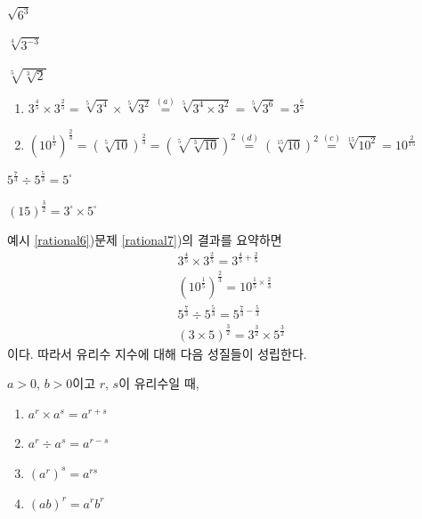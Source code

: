 \documentclass{oblivoir}
\begin{document}
%
\label{rational5}
\begin{enumerate*}[itemjoin=\hspace{.3\textwidth}]
\item
\(\sqrt{6^3}\)
\item
\(\sqrt[4]{3^{-3}}\)
\item
\(\sqrt[5]{\sqrt[3]{2}}\)
\end{enumerate*}

%
\begin{enumerate}\label{rational6}
\item
\(3^{\frac45}\times3^{\frac25}=\sqrt[5]{3^4}\times\sqrt[5]{3^2}\stackrel{(a)}=\sqrt[5]{3^4\times3^2}=\sqrt[5]{3^6}=3^{\frac 65}\)
\item
\((10^{\frac15})^{\frac23}=\left(\sqrt[5]{10}\right)^{\frac23}=\left(\sqrt[5]{\sqrt[3]{10}}\right)^2\stackrel{(d)}=\left(\sqrt[15]{10}\right)^2
\stackrel{(c)}=\sqrt[15]{10^2}=10^{\frac2{15}}\)
\end{enumerate}

%
\label{rational7}
\begin{enumerate*}[itemjoin=\hspace{.3\textwidth}]
\item
\(5^{\frac73}\div5^{\frac53}=5^\square\)
\item
\(\left(15\right)^{\frac32}=3^\square\times5^\square\)
\end{enumerate*}

\bigskip
예시 \ref{rational6})\과 문제 \ref{rational7})의 결과를 요약하면
\begin{gather*}
3^{\frac45}\times3^{\frac25}=3^{\frac45+\frac25}\\
\left(10^{\frac15}\right)^{\frac23}=10^{\frac15\times\frac23}\\
5^{\frac73}\div5^{\frac53}=5^{\frac73-\frac53}\\
\left(3\times5\right)^{\frac32}=3^{\frac32}\times5^{\frac32}
\end{gather*}
이다.
따라서 유리수 지수에 대해 다음 성질들이 성립한다.

%
\begin{mdframed}
\label{rational8}
\(a>0\), \(b>0\)이고 \(r\), \(s\)이 유리수일 때,
\begin{enumerate}
\item
\(a^r\times a^s=a^{r+s}\)
\item
\(a^r\div a^s=a^{r-s}\)
\item
\((a^r)^s=a^{rs}\)
\item
\((ab)^r=a^rb^r\)
\end{enumerate}
\end{mdframed}
\end{document}
